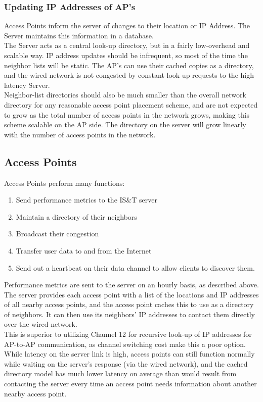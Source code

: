 \documentclass[11pt,twocolumn]{article}
\begin{document}
\subsubsection{Updating IP Addresses of AP's}
\indent Access Points inform the server of changes to their location or IP Address. The Server maintains this information in a database.\\
\indent The Server acts as a central look-up directory, but in a fairly low-overhead and scalable way. IP address updates should be infrequent, so most of the time the neighbor lists will be static. The AP's can use their cached copies as a directory, and the wired network is not congested by constant look-up requests to the high-latency Server.\\
\indent Neighbor-list directories should also be much smaller than the overall network directory for any reasonable access point placement scheme, and are not expected to grow as the total number of access points in the network grows, making this scheme scalable on the AP side. The directory on the server will grow linearly with the number of access points in the network.

\subsection{Access Points}
\indent Access Points perform many functions:
\begin{enumerate}
	\item Send performance metrics to the IS\&T server
	\item Maintain a directory of their neighbors
	\item Broadcast their congestion
	\item Transfer user data to and from the Internet
	\item Send out a heartbeat on their data channel to allow clients to discover them. 
\end{enumerate}
\indent Performance metrics are sent to the server on an hourly basis, as described above. The server provides each access point with a list of the locations and IP addresses of all nearby access points, and the access point caches this to use as a directory of neighbors. It can then use its neighbors’ IP addresses to contact them directly over the wired network.\\
\indent This is superior to utilizing Channel 12 for recursive look-up of IP addresses for AP-to-AP communication, as channel switching cost make this a poor option. While latency on the server link is high, access points can still function normally while waiting on the server’s response (via the wired network), and the cached directory model has much lower latency on average than would result from contacting the server every time an access point needs information about another nearby access point.
\end{document}
